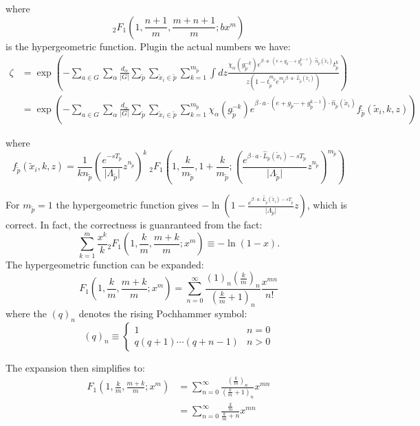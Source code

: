 \begin{description}
where
\[
_{2}F_{1}(1,\frac{n+1}{m},\frac{m+n+1}{m};bx^{m})
\]
is the hypergeometric function. Plugin the actual numbers we have:
\begin{align*}
\zeta & =\exp\left(-\sum_{a\in G}\sum_{\alpha}\frac{d_{\alpha}}{\vert G\vert}\sum_{\tilde{p}}\sum_{\tilde{x}_{i}\in\tilde{p}}\sum_{k=1}^{m_{\tilde{p}}}\int dz\frac{\chi_{\alpha}(g_{\tilde{p}}^{-k})e^{\beta\cdot a\cdot(e+g_{\tilde{p}}\cdots+g_{\tilde{p}}^{k-1})\cdot\hat{n}_{\tilde{p}}(\tilde{x}_{i})}t_{\tilde{p}}^{k}}{z(1-t_{\tilde{p}}^{m_{\tilde{p}}}e^{m_{\tilde{p}}\beta\cdot a\cdot\hat{L}_{\tilde{p}}(\tilde{x}_{i})})}\right)\\
 & =\exp\left(-\sum_{a\in G}\sum_{\alpha}\frac{d_{\alpha}}{\vert G\vert}\sum_{\tilde{p}}\sum_{\tilde{x}_{i}\in\tilde{p}}\sum_{k=1}^{m_{\tilde{p}}}\chi_{\alpha}(g_{\tilde{p}}^{-k})e^{\beta\cdot a\cdot(e+g_{\tilde{p}}\cdots+g_{\tilde{p}}^{k-1})\cdot\hat{n}_{\tilde{p}}(\tilde{x}_{i})}f_{\tilde{p}}(\tilde{x}_{i},k,z)\right)
\end{align*}


where
\[
f_{\tilde{p}}(\tilde{x}_{i},k,z)=\frac{1}{kn_{\tilde{p}}}\left(\frac{e^{-sT_{\tilde{p}}}}{\vert\Lambda_{\tilde{p}}\vert}z^{n_{\tilde{p}}}\right)^{k}\ _{2}F_{1}\left(1,\frac{k}{m_{\tilde{p}}},1+\frac{k}{m_{\tilde{p}}};\left(\frac{e^{\beta\cdot a\cdot\hat{L}_{\tilde{p}}(\tilde{x}_{i})-sT_{\tilde{p}}}}{\vert\Lambda_{\tilde{p}}\vert}z^{n_{\tilde{p}}}\right)^{m_{\tilde{p}}}\right)
\]


For $m_{\tilde{p}}=1$ the hypergeometric function gives $-\ln(1-\frac{e^{\beta\cdot a\cdot\hat{L}_{\tilde{p}}(\tilde{x}_{i})-sT_{\tilde{p}}}}{\vert\Lambda_{\tilde{p}}\vert}z)$,
which is correct. In fact, the correctness is guanranteed from the
fact:
\[
\sum_{k=1}^{m}\frac{x^{k}}{k}{}_{2}F_{1}(1,\frac{k}{m},\frac{m+k}{m};x^{m})\equiv-\ln(1-x).
\]
The hypergeometric function can be expanded:
\[
F_{1}(1,\frac{k}{m},\frac{m+k}{m};x^{m})=\sum_{n=0}^{\infty}\frac{(1)_{n}(\frac{k}{m})_{n}}{(\frac{k}{m}+1)_{n}}\frac{x^{mn}}{n!}
\]
where the $(q)_{n}$ denotes the rising Pochhammer symbol:
\[
(q)_{n}\equiv\begin{cases}
1 & n=0\\
q(q+1)\cdots(q+n-1) & n>0
\end{cases}
\]


The expansion then simplifies to:
\begin{align*}
F_{1}(1,\frac{k}{m},\frac{m+k}{m};x^{m}) & =\sum_{n=0}^{\infty}\frac{(\frac{k}{m})_{n}}{(\frac{k}{m}+1)_{n}}x^{mn}\\
 & =\sum_{n=0}^{\infty}\frac{\frac{k}{m}}{\frac{k}{m}+n}x^{mn}
\end{align*}



\end{description}
